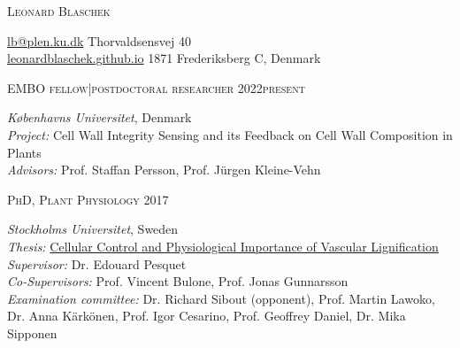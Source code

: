 \documentclass[11pt]{article}
\begin{document}
	\setlength\parindent{15pt}
\begin{center}
	\huge{\textsc{Leonard Blaschek}}
	\vspace*{0.5cm}
\end{center}

\noindent
\href{mailto:lb@plen.ku.dk}{lb@plen.ku.dk} \hfill Thorvaldsensvej 40\\
\href{https://leonardblaschek.github.io}{leonardblaschek.github.io} \hfill 1871 Frederiksberg C, Denmark%

\vspace{1.5cm}
\raggedright
	
\vspace{0.15cm}
\begin{addmargin}[15pt]{0pt}
\textsc{\large{EMBO fellow|postdoctoral researcher} \hfill \textsc{2022\textendash present}}
\end{addmargin}
\begin{addmargin}[24pt]{0pt}
	\textit{Københavns Universitet}, Denmark\\
	\textit{Project:} Cell Wall Integrity Sensing and its Feedback on Cell Wall Composition in Plants \\
	\textit{Advisors:} Prof. Staffan Persson, Prof. Jürgen Kleine-Vehn\\
\end{addmargin}
\vspace{0.5cm}
	
\vspace{0.15cm}

\begin{addmargin}[15pt]{0pt}
\textsc{\large{PhD, Plant Physiology} \hfill \textsc{2017}}
\end{addmargin}
\begin{addmargin}[24pt]{0pt}
	\textit{Stockholms Universitet}, Sweden \\
	\textit{Thesis:} \href{https://urn.kb.se/resolve?urn=urn:nbn:se:su:diva-203577}{Cellular Control and Physiological Importance of Vascular Lignification} \\
	\textit{Supervisor:} Dr. Edouard Pesquet \\
	\textit{Co-Supervisors:} Prof. Vincent Bulone, Prof. Jonas Gunnarsson\\
	\textit{Examination committee:} Dr. Richard Sibout (opponent), Prof. Martin Lawoko, Dr. Anna Kärkönen, Prof. Igor Cesarino, Prof. Geoffrey Daniel, Dr. Mika Sipponen
\end{addmargin}
\vspace{0.2cm}
\end{document}
